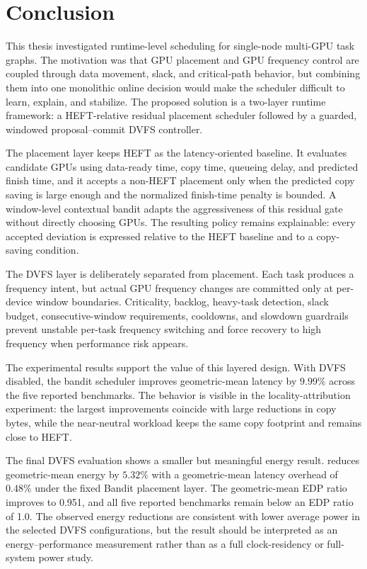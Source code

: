 \chapter{Conclusion}
\label{chap:conclusion}

This thesis investigated runtime-level scheduling for single-node multi-GPU
\CUDASTF{} task graphs. The motivation was that GPU placement and GPU frequency
control are coupled through data movement, slack, and critical-path behavior,
but combining them into one monolithic online decision would make the
scheduler difficult to learn, explain, and stabilize. The proposed solution is
a two-layer runtime framework: a HEFT-relative residual placement scheduler
followed by a guarded, windowed proposal--commit DVFS controller.

The placement layer keeps HEFT as the latency-oriented baseline. It evaluates
candidate GPUs using data-ready time, copy time, queueing delay, and predicted
finish time, and it accepts a non-HEFT placement only when the predicted copy
saving is large enough and the normalized finish-time penalty is bounded. A
window-level contextual bandit adapts the aggressiveness of this residual gate
without directly choosing GPUs. The resulting policy remains explainable:
every accepted deviation is expressed relative to the HEFT baseline and to a
copy-saving condition.

The DVFS layer is deliberately separated from placement. Each task produces a
frequency intent, but actual GPU frequency changes are committed only at
per-device window boundaries. Criticality, backlog, heavy-task detection,
slack budget, consecutive-window requirements, cooldowns, and slowdown
guardrails prevent unstable per-task frequency switching and force recovery to
high frequency when performance risk appears.

The experimental results support the value of this layered design. With DVFS
disabled, the bandit scheduler improves geometric-mean latency by \(9.99\%\)
across the five reported benchmarks. The behavior is visible in the
locality-attribution experiment: the largest improvements coincide with large
reductions in copy bytes, while the near-neutral workload keeps the same copy
footprint and remains close to HEFT.

The final DVFS evaluation shows a smaller but meaningful energy result.
\WinDVFS{} reduces geometric-mean energy by \(5.32\%\) with a geometric-mean
latency overhead of \(0.48\%\) under the fixed Bandit placement layer. The
geometric-mean EDP ratio improves to 0.951, and all five reported
benchmarks remain below an EDP ratio of 1.0. The observed energy reductions
are consistent with lower average power in the selected DVFS configurations,
but the result should be interpreted as an energy--performance measurement
rather than as a full clock-residency or full-system power study.

